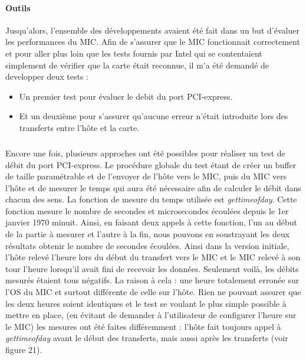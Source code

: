 \documentclass{article}
\begin{document}
				\paragraph{Outils}
				Jusqu'alors, l'ensemble des développements avaient été fait dans un but d'évaluer les performances du MIC. 
				Afin de s'assurer que le MIC fonctionnait correctement et pour aller plus loin que les tests fournis par 
				Intel qui se contentaient simplement de vérifier que la carte était reconnue, il m'a été demandé de 
				developper deux tests : \newline
				\begin{itemize}
				\item Un premier test pour évaluer le debit du port PCI-express.
				\item Et un deuxième pour s'assurer qu'aucune erreur n'était introduite lors des transferts entre
				l'hôte et la carte.
				\end{itemize}
					\subparagraph{}
					Encore une fois, plusieurs approches ont été possibles pour réaliser un test de débit du port PCI-express.
					Le procédure globale du test étant de créer un buffer de taille paramétrable et de l'envoyer de l'hôte 
					vers le MIC, puis du MIC vers l'hôte et de mesurer le temps qui aura été nécessaire afin de calculer le 
					débit dans chacun des sens. La fonction de mesure du temps utilisée est \emph{gettimeofday}. Cette fonction 
					mesure le nombre de secondes et microsecondes écoulées depuis le 1er janvier 1970 minuit. Ainsi, en faisant 
					deux appels à cette fonction, l'un au début de la partie à mesurer et l'autre à la fin, nous pouvons en 
					soustrayant les deux résultats obtenir le nombre de secondes écoulées.\newline
					Ainsi dans la version initiale, l'hôte relevé l'heure lors du début du transfert vers le MIC et le MIC relevé 
					à son tour l'heure lorsqu'il avait fini de recevoir les données. Seulement voilà, les débits mesurés étaient 
					tous négatifs. La raison à cela : une heure totalement erronée sur l'OS du MIC et surtout différente de celle 
					sur l'hôte. Rien ne pouvant assurer que les deux heures soient identiques et le test se voulant le plus 
					simple possible à mettre en place, (en évitant de demander à l'utilisateur de configurer l'heure sur le MIC) 
					les mesures ont été faites différemment : \newline
					l'hôte fait toujours appel à \emph{gettimeofday} avant le début des transferts, mais aussi après les 
					transferts (voir figure 21).
\end{document}
